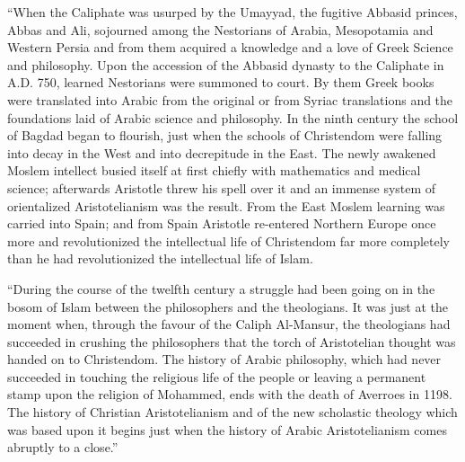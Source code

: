 \documentclass{book}
\begin{document}
“When the Caliphate was usurped by the Umayyad, the fugitive Abbasid princes, Abbas and Ali, sojourned among the Nestorians of Arabia, Mesopotamia and Western Persia and from them acquired a knowledge and a love of Greek Science and philosophy. Upon the accession of the Abbasid dynasty to the Caliphate in A.D. 750, learned Nestorians were summoned to court. By them Greek books were translated into Arabic from the original or from Syriac translations and the foundations laid of Arabic science and philosophy. In the ninth century the school of Bagdad began to flourish, just when the schools of Christendom were falling into decay in the West and into decrepitude in the East. The newly awakened Moslem intellect busied itself at first chiefly with mathematics and medical science; afterwards Aristotle threw his spell over it and an immense system of orientalized Aristotelianism was the result. From the East Moslem learning was carried into Spain; and from Spain Aristotle re-entered Northern Europe once more and revolutionized the intellectual life of Christendom far more completely than he had revolutionized the intellectual life of Islam.

“During the course of the twelfth century a struggle had been going on in the bosom of Islam between the philosophers and the theologians. It was just at the moment when, through the favour of the Caliph Al-Mansur, the theologians had succeeded in crushing the philosophers that the torch of Aristotelian thought was handed on to Christendom. The history of Arabic philosophy, which had never succeeded in touching the religious life of the people or leaving a permanent stamp upon the religion of Mohammed, ends with the death of Averroes in 1198. The history of Christian Aristotelianism and of the new scholastic theology which was based upon it begins just when the history of Arabic Aristotelianism comes abruptly to a close.”\footnotemark[3]
\end{document}
